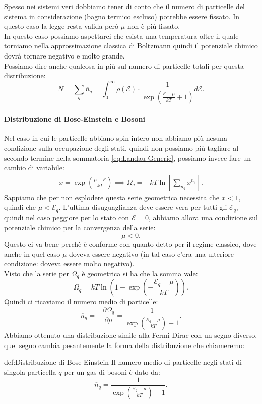 Spesso nei sistemi veri dobbiamo tener di conto che il numero di particelle del sistema in considerazione (bagno termico escluso) potrebbe essere fissato. In questo caso la legge resta valida però $\mu$ non è più fissato.\\
In questo caso possiamo aspettarci che esista una temperatura oltre il quale torniamo nella approssimazione classica di Boltzmann quindi il potenziale chimico dovrà tornare negativo e molto grande. \\
Possiamo dire anche qualcosa in più sul numero di particelle totali per questa distribuzione:
\[
	N = \sum_{q}^{} \overline{n}_{q} = \int_{0}^{\infty} \rho ( \mathcal{E} ) \cdot \frac{1}{\exp\left( \frac{\mathcal{E} -\mu }{kT} + 1 \right) } d\mathcal{E} 
.\] 
\paragraph{Distribuzione di Bose-Einstein e Bosoni}%
Nel caso in cui le particelle abbiano spin intero non abbiamo più nesuna condizione sulla occupazione degli stati, quindi non possiamo più tagliare al secondo termine nella sommatoria \ref{eq:Landau-Generic}, possiamo invece fare un cambio di variabile:
\begin{align}
	x = \exp\left( \frac{\mu -\mathcal{E} }{kT} \right) \implies
	\Omega _{q} = -kT \ln \left[ \sum_{n_{q}}^{} x^{n_{q}} \right] 
.\end{align}
Sappiamo che per non esplodere questa serie geometrica necessita che $x<1$, quindi che $\mu < \mathcal{E} _{q}$.
L'ultima disuguaglianza deve essere vera per tutti gli $\mathcal{E}_{q}$, quindi nel caso peggiore per lo stato con $\mathcal{E} = 0$, abbiamo allora una condizione sul potenziale chimico per la convergenza della serie:
\[
	\mu < 0
.\] 
Questo ci va bene perchè è conforme con quanto detto per il regime classico, dove anche in quel caso $\mu$ doveva essere negativo (in tal caso c'era una ulteriore condizione: doveva essere molto negativo).\\
Visto che la serie per $\Omega _{q}$ è geometrica si ha che la somma vale:
 \[
	 \Omega _{q} = kT \ln\left( 1-\exp\left( -\frac{\mathcal{E} _{q}-\mu }{kT} \right)  \right) 
.\] 
Quindi ci ricaviamo il numero medio di particelle: 
\[
	\overline{n}_{q} = - \frac{\partial \Omega _{q}}{\partial \mu } = \frac{1}{\exp\left( \frac{\mathcal{E} _{q}- \mu }{kT} \right)-1 }
.\] 
Abbiamo ottenuto una distribuzione simile alla Fermi-Dirac con un segno diverso, quel segno cambia pesantemente la forma della distribuzione che chiameremo:
\begin{defn}{def:Distribuzione di Bose-Einstein}
	Il numero medio di particelle negli stati di singola particella $q$ per un gas di bosoni è dato da:
	\[
		\overline{n}_{q} = \frac{1}{\exp\left( \frac{\mathcal{E} _{q}-\mu}{kT} \right) - 1}
	.\]
\end{defn}
